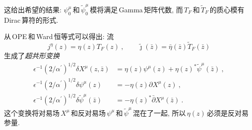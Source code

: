 这给出希望的结果: $\psi_{0}^{\mu}\,$和$\,\tilde{\psi}_{0}^{\mu}\,$模将满足\,Gamma\,矩阵代数, 而$\,T_{F}\,$和$\,\tilde{T}_{F}\,$的质心模有\,Dirac\,算符的形式. 

从\,OPE\,和\,Ward\,恒等式可以得出: 流
\begin{equation}
    j^{\eta}(z)=\eta(z)T_{F}(z)\:, \qquad
    \tilde{\jmath}(\bar{z})=\bar{\eta}(\bar{z}) \tilde{T}_{F}(\bar{z}) \label{10.1.9}
\end{equation}
生成了{\emph{超共形变换}}
\begin{subequations}
\begin{align}
     \epsilon^{-1}(2/\alpha^{\prime})^{1/2}\delta X^{\mu}(z,\bar{z}) &= \eta(z)\psi^{\mu}(z) + \eta(z)^{\ast} \tilde{\psi}^{\mu}(\bar{z})\:, \label{10.1.10a} \\
      \epsilon^{-1}(2/\alpha^{\prime})^{1/2}\delta \psi^{\mu}(z) &= -\eta(z)\partial X^{\mu}(z) \:, \label{10.1.10b}  \\
      \epsilon^{-1}(2/\alpha^{\prime})^{1/2}\delta\tilde{\psi}^{\mu}(\bar{z}) &=-\eta(z)^{\ast}\bar{\partial} X^{\mu}(\bar{z}) \:. \label{10.1.10c}
\end{align}
\end{subequations}
这个变换将对易场$\,X^{\mu}\,$和反对易场$\,\psi^{\mu}\,$和$\,\tilde{\psi}^{\mu}\,$混在了一起, 所以$\,\eta(z)\,$必须是反对易参量. 

